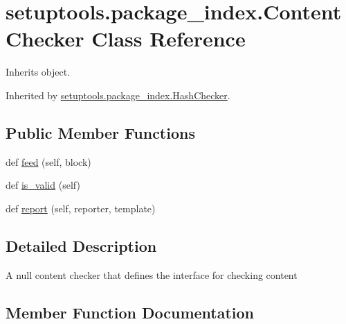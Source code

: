 \hypertarget{classsetuptools_1_1package__index_1_1_content_checker}{}\section{setuptools.\+package\+\_\+index.\+Content\+Checker Class Reference}
\label{classsetuptools_1_1package__index_1_1_content_checker}


Inherits object.



Inherited by \hyperlink{classsetuptools_1_1package__index_1_1_hash_checker}{setuptools.\+package\+\_\+index.\+Hash\+Checker}.

\subsection*{Public Member Functions}
\begin{DoxyCompactItemize}
\item 
def \hyperlink{classsetuptools_1_1package__index_1_1_content_checker_a13b8b787afa956344f5eab6445f1d214}{feed} (self, block)
\item 
def \hyperlink{classsetuptools_1_1package__index_1_1_content_checker_a981f111f10e8174e1aa6fdc8f7999f26}{is\+\_\+valid} (self)
\item 
def \hyperlink{classsetuptools_1_1package__index_1_1_content_checker_a861a390c4a6f66d304be4a23cbe51964}{report} (self, reporter, template)
\end{DoxyCompactItemize}


\subsection{Detailed Description}
\begin{DoxyVerb}A null content checker that defines the interface for checking content
\end{DoxyVerb}
 

\subsection{Member Function Documentation}
\mbox{\label{classsetuptools_1_1package__index_1_1_content_checker_a13b8b787afa956344f5eab6445f1d214}} 
